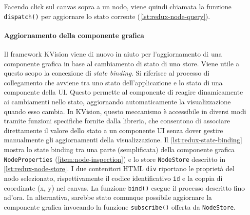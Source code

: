 
Facendo click sul canvas sopra a un nodo, viene quindi chiamata la funzione \texttt{dispatch()} per aggiornare lo stato corrente (\cref{lst:redux-node-query}).



\newpage
\paragraph{Aggiornamento della componente grafica}
Il framework KVision viene di nuovo in aiuto per l'aggiornamento di una componente grafica in base al cambiamento di stato di uno store. Viene utile a questo scopo la concezione di \textit{state binding}. Si riferisce al processo di collegamento che avviene tra uno stato dell'applicazione e lo stato di una componente della \ac{UI}.  Questo permette al componente di reagire dinamicamente ai cambiamenti nello stato, aggiornando automaticamente la visualizzazione quando esso cambia. In KVision, questo meccanismo è accessibile in diversi modi tramite funzioni specifiche fornite dalla libreria, che consentono di associare direttamente il valore dello stato a un componente \ac{UI} senza dover gestire manualmente gli aggiornamenti della visualizzazione. Il \cref{lst:redux-state-binding} mostra lo state binding tra una parte (semplificata) della componente grafica \texttt{NodeProperties} (\cref{item:node-inspection}) e lo store \texttt{NodeStore} descritto in \cref{lst:redux-node-store}. I due contenitori HTML \texttt{div} riportano le proprietà del nodo selezionato, rispettivamente il codice identificativo \texttt{id} e la coppia di coordinate (x, y) nel canvas.
La funzione \texttt{bind()} esegue il processo descritto fino ad'ora. In alternativa, sarebbe stato comunque possibile aggiornare la componente grafica invocando la funzione \texttt{subscribe()} offerta da \texttt{NodeStore}. 



